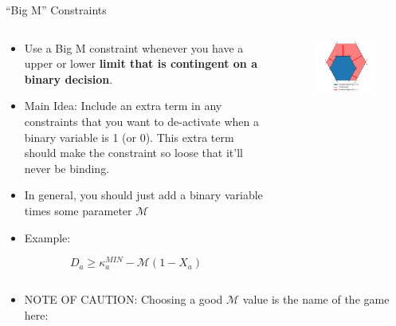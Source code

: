 \documentclass[10pt, aspectratio=169]{beamer}
\begin{document}
\begin{frame}{\enquote{Big M} Constraints}
    \vspace{-0.4cm}
    \begin{columns}
        \begin{column}{0.5\textwidth}
            \begin{itemize}
                \item Use a Big M constraint whenever you have a upper or lower \textbf{limit that is contingent on a binary decision}.
                \item Main Idea: Include an extra term in any constraints that you want to de-activate when a binary variable is 1 (or 0). This extra term should make the constraint so loose that it'll never be binding.
                \item In general, you should just add a binary variable times some  parameter $\mathcal{M}$
                \item Example:
            \end{itemize}
            $$D_a \geq \kappa^{MIN}_a - \mathcal{M} (1-X_a)$$
        \end{column}
        \begin{column}{0.5\textwidth}
            \begin{figure}
                \includegraphics[width=0.8\linewidth]{ExpandedBigM.png}
            \end{figure}
        \end{column}
    \end{columns}
    \begin{itemize}
        \item NOTE OF CAUTION: Choosing a good $\mathcal{M}$ value is the name of the game here:

\end{itemize}
\end{frame}
\end{document}
